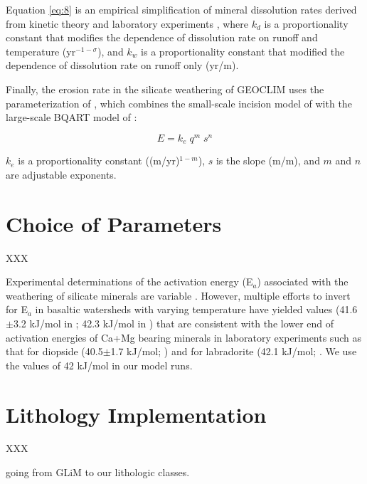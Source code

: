 \documentclass[11pt,letterpaper]{article}
\begin{document}
\noindent
Equation \ref{eq:8} is an empirical simplification of mineral dissolution rates derived from kinetic theory and laboratory experiments \citet{West2012a}, where $k_{d}$ is a proportionality constant that modifies the dependence of dissolution rate on runoff and temperature (yr$^{-1-\sigma}$), and $k_{w}$ is a proportionality constant that modified the dependence of dissolution rate on runoff only (yr/m).

Finally, the erosion rate in the silicate weathering of GEOCLIM uses the parameterization of \citet{Maffre2018a}, which combines the small-scale incision model of \citet{Davy2000a} with the large-scale BQART model of \citet{Syvitski2007a}:

\begin{equation}
    E = k_{e}\;q^{m}\;s^{n}
    \label{eq:9}
\end{equation}

\noindent
$k_{e}$ is a proportionality constant ((m/yr)$^{1-m}$), $s$ is the slope (m/m), and $m$ and $n$ are adjustable exponents.

\section*{Choice of Parameters}

XXX

Experimental determinations of the activation energy (E$_a$) associated with the weathering of silicate minerals are variable \citep{Brantley2003a}. However, multiple efforts to invert for E$_a$ in basaltic watersheds with varying temperature have yielded values (41.6$\pm$3.2 kJ/mol in \citealp{Li2016a}; 42.3 kJ/mol in \citealp{Dessert2001a}) that are consistent with the lower end of activation energies of Ca+Mg bearing minerals in laboratory experiments such as that for diopside (40.5$\pm$1.7 kJ/mol; \citealp{Knauss1993a}) and for labradorite (42.1 kJ/mol; \citealp{Carroll2005a}. We use the values of 42 kJ/mol in our model runs.

\section*{Lithology Implementation}

XXX

going from GLiM to our lithologic classes.

\clearpage

\singlespacing

\newpage



\end{document}
